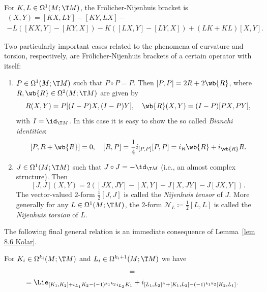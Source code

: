 \begin{lem}
    For $K,L\in\Omega^1(M;\T M)$, the Fr\"olicher-Nijenhuis bracket is 
    \begin{multline}
        [K,L](X,Y)=[KX,LY]-[KY,LX]-\\-L([KX,Y]-[KY,X])-K([LX,Y]-[LY,X])+(LK+KL)[X,Y].
    \end{multline}
\end{lem}

\begin{rem}\label{ex frolicher curvature and torsion}
    Two particularly important cases related to the phenomena of curvature and torsion, respectively, are  Fr\"olicher-Nijenhuis brackets of a certain operator with itself:
    \begin{enumerate}
        \item $P\in\Omega^1(M;\T M)$ such that $P\circ P=P$. Then $[P,P]=2R+2\wb{R}$, where $R,\wb{R}\in\Omega^2(M;\T M)$ are given by 
        \[R(X,Y)=P[(I-P)X,(I-P)Y],\quad \wb{R}(X,Y)=(I-P)[PX,PY],\]
        with $I=\id_{\T M}$. In this case it is easy to show the so called \emph{Bianchi identities}: 
        \[[P,R+\wb{R}]=0,\quad [R,P]=\frac14i_{[P,P]}[P,P]=i_R \wb{R}+i_{\wb{R}}R.\]
        \item $J\in\Omega^1(M;\T M)$ such that $J\circ J=-\id_{\T M}$ (i.e., an almost complex structure). Then 
        \[[J,J](X,Y)=2([JX,JY]-[X,Y]-J[X,JY]-J[JX,Y]).\]
        The vector-valued $2$-form $\frac{1}{2}[J,J]$ is called the \emph{Nijenhuis tensor} of $J$. More generally for any $L\in \Omega^1(M;\T M)$, the $2$-form $\mathcal{N}_L\coloneqq \frac12[L,L]$ is called the \emph{Nijenhuis torsion} of $L$.
    \end{enumerate}
\end{rem}


The following final general relation is an immediate consequence of Lemma~\ref{lem 8.6 Kolar}.

\begin{thm}
    For $K_i\in\Omega^{k_i}(M;\T M)$ and $L_i\in\Omega^{k_i+1}(M;\T M)$ we have 
    \begin{multline}
        [\Lie_{K_1}+i_{L_1},\Lie_{K_2}+i_{L_2}]=\\
        =\Lie_{[K_1,K_2]+i_{L_1}K_2-(-1)^{k_1k_2}i_{L_2}K_1}+
        i_{[L_1,L_2]^{\wedge}+[K_1,L_2]-(-1)^{k_1k_2}[K_2,L_1]}.
    \end{multline}
\end{thm}

